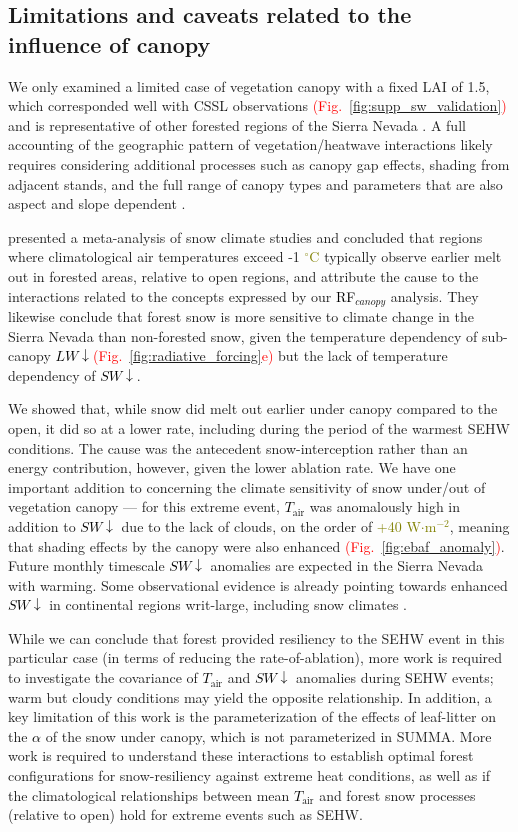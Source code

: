 \documentclass[draft]{agujournal2019}
\newcommand{\fig}[2]{\textcolor{red}{(Fig.~\ref{#1}{#2})}}   %
\newcommand{\mynum}[1]{\textcolor{olive}{#1}}
\newcommand{\tair}{\textcolor{black}{$T_{\mathrm{air}}$}\xspace}
\newcommand{\lwdn}{\textcolor{black}{$LW\downarrow$}\xspace}
\newcommand{\swdn}{\textcolor{black}{$SW\downarrow$}\xspace}
\newcommand{\albedo}{\textcolor{black}{$\alpha$}\xspace}
\newcommand{\rfcanopy}{\textcolor{black}{RF$_{canopy}$}\xspace}
\newcommand{\wmsq}{\textcolor{olive}{W$\cdot$m$^{-2}$}\xspace}
\newcommand{\degrc}{\textcolor{olive}{$^\circ$C}\xspace}
\begin{document}
\subsection{Limitations and caveats related to the influence of canopy} 
We only examined a limited case of vegetation canopy with a fixed LAI of 1.5, which corresponded well with CSSL observations \fig{fig:supp_sw_validation}{} and is representative of other forested regions of the Sierra Nevada \cite{VanGunst2012, Krogh2020-dh}.
A full accounting of the geographic pattern of vegetation/heatwave interactions likely requires considering additional processes such as canopy gap effects, shading from adjacent stands, and the full range of canopy types and parameters that are also aspect and slope dependent \cite{Broxton2015-wh}.

 presented a meta-analysis of snow climate studies and concluded that regions where climatological air temperatures exceed -1 \degrc typically observe earlier melt out in forested areas, relative to open regions, and attribute the cause to the interactions related to the concepts expressed by our \rfcanopy analysis.
They likewise conclude that forest snow is more sensitive to climate change in the Sierra Nevada than non-forested snow, given the temperature dependency of sub-canopy \lwdn \fig{fig:radiative_forcing}{e} but the lack of temperature dependency of \swdn.

We showed that, while snow did melt out earlier under canopy compared to the open, it did so at a lower rate, including during the period of the warmest SEHW conditions.
The cause was the antecedent snow-interception rather than an energy contribution, however, given the lower ablation rate.
We have one important addition to  concerning the climate sensitivity of snow under/out of vegetation canopy --- for this extreme event, \tair was anomalously high in addition to \swdn due to the lack of clouds, on the order of \mynum{+40} \wmsq, meaning that shading effects by the canopy were also enhanced \fig{fig:ebaf_anomaly}{}.
Future monthly timescale \swdn anomalies are expected in the Sierra Nevada with warming.
Some observational evidence is already pointing towards enhanced \swdn in continental regions writ-large, including snow climates \cite{Nyeki2019-ej}.


While we can conclude that forest provided resiliency to the SEHW event in this particular case (in terms of reducing the rate-of-ablation), more work is required to investigate the covariance of \tair and \swdn anomalies during SEHW events; warm but cloudy conditions may yield the opposite relationship.
In addition, a key limitation of this work is the parameterization of the effects of leaf-litter on the \albedo of the snow under canopy, which is not parameterized in SUMMA.
More work is required to understand these interactions to establish optimal forest configurations for snow-resiliency against extreme heat conditions, as well as if the climatological relationships between mean \tair and forest snow processes (relative to open) hold for extreme events such as SEHW.
\end{document}
